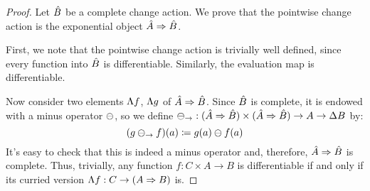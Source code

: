 \pointwiseComplete*
\begin{proof}
\label{prf:pointwiseComplete}
  Let $\hat{B}$ be a complete change action.
  We prove that the pointwise change action is the exponential object ${\hat{A}} \Rightarrow {\hat{B}}$.

  First, we note that the pointwise change action is trivially well defined, since
  every function into $\hat{B}$ is differentiable. Similarly, the evaluation map
  is differentiable.

  Now consider two elements $\Lambda{f}$, $\Lambda{g}$ of ${\hat{A}} \Rightarrow {\hat{B}}$. Since
  $\hat{B}$ is complete, it is endowed with a minus operator $\ominus$, so we define
  $\ominus_\rightarrow : ({\hat{A}} \Rightarrow {\hat{B}}) \times ({\hat{A}} \Rightarrow {\hat{B}}) \rightarrow A \rightarrow \Delta B$ by:
  $$ (g \ominus_\rightarrow f)(a) \coloneqq g(a) \ominus f(a) $$
  It's easy to check that this is indeed a minus operator and, therefore, ${\hat{A}} \Rightarrow {\hat{B}}$
  is complete. Thus, trivially, any function $f : C \times A \rightarrow B$ is differentiable
  if and only if its curried version $\Lambda{f} : C \rightarrow ({A} \Rightarrow {B})$ is.
\end{proof}




